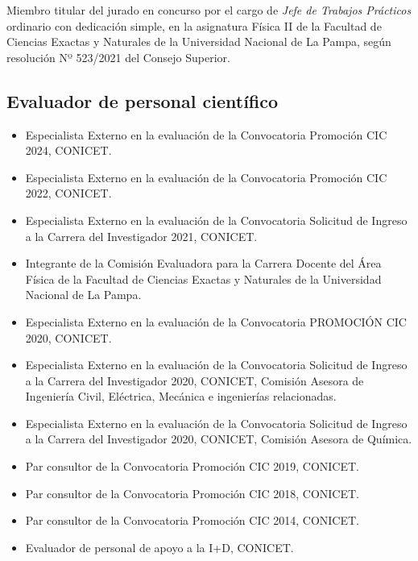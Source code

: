  Miembro titular del jurado en concurso por el cargo de \textit{Jefe de Trabajos Prácticos} ordinario con dedicación simple, en la asignatura Física II de la Facultad de Ciencias Exactas y Naturales de la Universidad Nacional de La Pampa, según resolución Nº 523/2021 del Consejo Superior.


\subsection{Evaluador de personal científico}

\begin{itemize} \setlength\itemsep{-0.25em}
	\item {} Especialista Externo en la evaluación de la Convocatoria Promoción CIC 2024, CONICET.
	\item {} Especialista Externo en la evaluación de la Convocatoria Promoción CIC 2022, CONICET.
	\item {} Especialista Externo en la evaluación de la Convocatoria Solicitud de Ingreso a la Carrera del Investigador 2021, CONICET.
	\item {} Integrante de la Comisión Evaluadora para la Carrera Docente del Área Física de la Facultad de Ciencias Exactas y Naturales de la Universidad Nacional de La Pampa.
	\item Especialista Externo en la evaluación de la Convocatoria PROMOCIÓN CIC 2020, CONICET.
	\item {} Especialista Externo en la evaluación de la Convocatoria Solicitud de Ingreso a la Carrera del Investigador 2020, CONICET, Comisión Asesora de Ingeniería Civil, Eléctrica, Mecánica e ingenierías relacionadas.
	\item Especialista Externo en la evaluación de la Convocatoria Solicitud de Ingreso a la Carrera del Investigador 2020, CONICET, Comisión Asesora de Química.
	\item {} Par consultor de la Convocatoria Promoción CIC 2019, CONICET.
	\item {} Par consultor de la Convocatoria Promoción CIC 2018, CONICET.
	\item {} Par consultor de la Convocatoria Promoción CIC 2014, CONICET.
	\item {} Evaluador de personal de apoyo a la I+D, CONICET.
\end{itemize}


